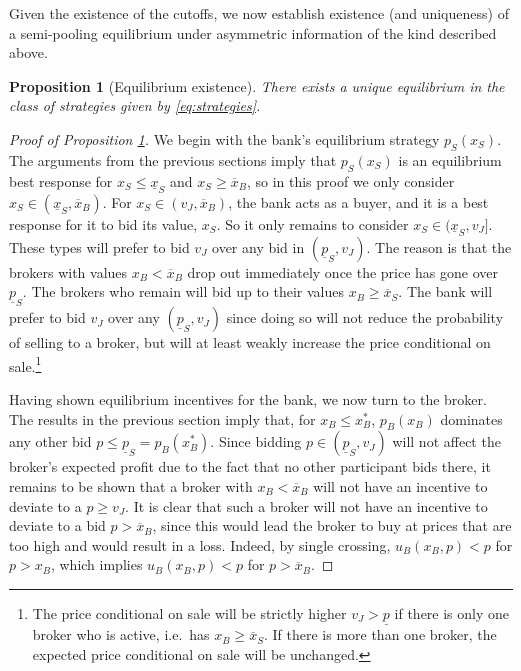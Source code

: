 \documentclass[11pt,twopage]{article}
\newcommand{\ol}{\overline}
\newcommand{\ul}{\underline}
\newtheorem{proposition}{Proposition}
{\bf}{\it}
\begin{document}
Given the existence of the cutoffs, we now establish existence (and
uniqueness) of a semi-pooling equilibrium under asymmetric information
of the kind described above.
\begin{proposition}[Equilibrium
  existence]\label{prop:equilibrium_existence}
  There exists a unique equilibrium in the class of strategies given
  by \eqref{eq:strategies}.
\end{proposition}
\begin{proof}[Proof of Proposition \ref{prop:equilibrium_existence}]
  We begin with the bank's equilibrium strategy $p_S(x_S)$. The
  arguments from the previous sections imply that $p_S(x_S)$ is an
  equilibrium best response for $x_S \leq \underline x_S$ and $x_S
  \geq \overline x_B$, so in this proof we only consider $x_S \in
  (\underline x_S, \overline x_B)$. For $x_S \in (v_J, \ol x_B)$, the
  bank acts as a buyer, and it is a best response for it to bid its
  value, $x_S$.  So it only remains to consider $x_S \in (\underline
  x_S, v_J]$. These types will prefer to bid $v_J$ over any bid in
  $(\underline p_S, v_J)$. The reason is that the brokers with values
  $x_B<\overline x_B$ drop out immediately once the price has gone
  over $\underline p_S$. The brokers who remain will bid up to their
  values $x_B\geq \overline x_S$. The bank will prefer to bid $v_J$
  over any $(\underline p_S, v_J)$ since doing so will not reduce the
  probability of selling to a broker, but will at least weakly
  increase the price conditional on sale.\footnote{The price
    conditional on sale will be strictly higher $v_J>\ul p$ if there
    is only one broker who is active, i.e.\ has $x_B\geq \overline
    x_S$. If there is more than one broker, the expected price
    conditional on sale will be unchanged.}

  Having shown equilibrium incentives for the bank, we now turn to the
  broker. The results in the previous section imply that, for $x_B
  \leq x_B^*$, $p_B(x_B)$ dominates any other bid $p \leq \ul p_S =
  p_B(x_B^*)$. Since bidding $ p \in (\ul p_S,v_J) $ will not affect
  the broker's expected profit due to the fact that no other
  participant bids there, it remains to be shown that a broker with
  $x_B < \ol x_B$ will not have an incentive to deviate to a $p\geq
  v_J$. It is clear that such a broker will not have an incentive to
  deviate to a bid $p> \ol x_B$, since this would lead the broker to
  buy at prices that are too high and would result in a loss. Indeed,
  by single crossing, $u_B(x_B,p) < p$ for $p>x_B$, which implies
  $u_B(x_B,p) < p$ for $p > \ol x_B$.


\end{proof}
\end{document}
